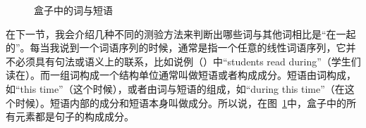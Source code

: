\begin{figure}
\centering
{}
\caption{\label{Abbildung-Schachteln}盒子中的词与短语}
\end{figure}%

\noindent
在下一节，我会介绍几种不同的测验方法来判断出哪些词与其他词相比是“在一起的”。每当我说到一个词语序列的时候，通常是指一个任意的线性词语序列，它并不必须具有句法或语义上的联系，比如说例（）中“students read during”（学生们读在）。而一组词构成一个结构单位通常叫做短语或者构成成分。短语由词构成，如“this time”（这个时候），或者由词与短语的组成，如“during this time”（在这个时候）。短语内部的成分和短语本身叫做成分。所以说，在图~\ref{Abbildung-Schachteln}中，盒子中的所有元素都是句子的构成成分。



